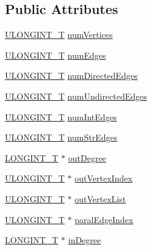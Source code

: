 \subsection*{Public Attributes}
\begin{DoxyCompactItemize}
\item 
\hyperlink{defs_8h_ade719b705ff384b386384c9385517e0b}{U\-L\-O\-N\-G\-I\-N\-T\-\_\-\-T} \hyperlink{structgraph_ab5f6668917726b1556b7306a3933cf2a}{num\-Vertices}
\item 
\hyperlink{defs_8h_ade719b705ff384b386384c9385517e0b}{U\-L\-O\-N\-G\-I\-N\-T\-\_\-\-T} \hyperlink{structgraph_aa4d98cf0c8acd60df8d9cbacb4fa2834}{num\-Edges}
\item 
\hyperlink{defs_8h_ade719b705ff384b386384c9385517e0b}{U\-L\-O\-N\-G\-I\-N\-T\-\_\-\-T} \hyperlink{structgraph_addd8a4672668994b56602e5938e36844}{num\-Directed\-Edges}
\item 
\hyperlink{defs_8h_ade719b705ff384b386384c9385517e0b}{U\-L\-O\-N\-G\-I\-N\-T\-\_\-\-T} \hyperlink{structgraph_a5dde0bbd1b4b635ac00ca089eb1b5030}{num\-Undirected\-Edges}
\item 
\hyperlink{defs_8h_ade719b705ff384b386384c9385517e0b}{U\-L\-O\-N\-G\-I\-N\-T\-\_\-\-T} \hyperlink{structgraph_a8affbfc44cd181715b91098857cdbdab}{num\-Int\-Edges}
\item 
\hyperlink{defs_8h_ade719b705ff384b386384c9385517e0b}{U\-L\-O\-N\-G\-I\-N\-T\-\_\-\-T} \hyperlink{structgraph_a442c29b20e58597d48b7ee1726587b2b}{num\-Str\-Edges}
\item 
\hyperlink{defs_8h_a9408c2d3d0a808675815ba4d87712087}{L\-O\-N\-G\-I\-N\-T\-\_\-\-T} $\ast$ \hyperlink{structgraph_a88be5ff5217680aa53c16b6adcded249}{out\-Degree}
\item 
\hyperlink{defs_8h_ade719b705ff384b386384c9385517e0b}{U\-L\-O\-N\-G\-I\-N\-T\-\_\-\-T} $\ast$ \hyperlink{structgraph_a3b806cd011f7a2d0a5ca6bd964f80d3d}{out\-Vertex\-Index}
\item 
\hyperlink{defs_8h_ade719b705ff384b386384c9385517e0b}{U\-L\-O\-N\-G\-I\-N\-T\-\_\-\-T} $\ast$ \hyperlink{structgraph_a3759f331476b226794074ad497e3332b}{out\-Vertex\-List}
\item 
\hyperlink{defs_8h_ade719b705ff384b386384c9385517e0b}{U\-L\-O\-N\-G\-I\-N\-T\-\_\-\-T} $\ast$ \hyperlink{structgraph_abcc42b313a9af28274063f80dfee625e}{paral\-Edge\-Index}
\item 
\hyperlink{defs_8h_a9408c2d3d0a808675815ba4d87712087}{L\-O\-N\-G\-I\-N\-T\-\_\-\-T} $\ast$ \hyperlink{structgraph_aa64803721adead49b996cf62d7e18d4a}{in\-Degree}
\item 

\end{DoxyCompactItemize}
